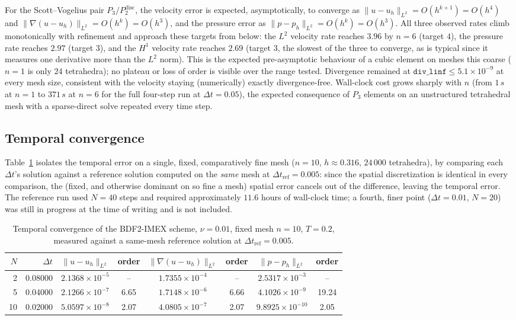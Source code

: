 \documentclass[11pt]{article}
\begin{document}
For the Scott--Vogelius pair $P_3/P_2^{\mathrm{disc}}$, the velocity error is expected,
asymptotically, to converge as $\|u-u_h\|_{L^2}=O(h^{k+1})=O(h^4)$ and
$\|\nabla(u-u_h)\|_{L^2}=O(h^{k})=O(h^3)$, and the pressure error as
$\|p-p_h\|_{L^2}=O(h^{k})=O(h^3)$. All three observed rates climb monotonically with
refinement and approach these targets from below: the $L^2$ velocity rate reaches $3.96$
by $n=6$ (target $4$), the pressure rate reaches $2.97$ (target $3$), and the $H^1$
velocity rate reaches $2.69$ (target $3$, the slowest of the three to converge, as is
typical since it measures one derivative more than the $L^2$ norm). This is the expected
pre-asymptotic behaviour of a cubic element on meshes this coarse ($n=1$ is only $24$
tetrahedra); no plateau or loss of order is visible over the range tested. Divergence
remained at $\mathtt{div\_linf}\le5.1\times10^{-9}$ at every mesh size, consistent with
the velocity staying (numerically) exactly divergence-free. Wall-clock cost grows sharply
with $n$ (from $1\,\si{s}$ at $n=1$ to $371\,\si{s}$ at $n=6$ for the full four-step run at
$\Delta t=0.05$), the expected consequence of $P_3$ elements on an unstructured tetrahedral
mesh with a sparse-direct solve repeated every time step.

\subsection{Temporal convergence}
\label{sec:3d-time}

Table~\ref{tab:3d-time} isolates the temporal error on a single, fixed, comparatively fine
mesh ($n=10$, $h\approx0.316$, $24\,000$ tetrahedra), by comparing each $\Delta t$'s
solution against a reference solution computed on the \emph{same} mesh at
$\Delta t_{\mathrm{ref}}=0.005$: since the spatial discretization is identical in every
comparison, the (fixed, and otherwise dominant on so fine a mesh) spatial error cancels
out of the difference, leaving the temporal error. The reference run used $N=40$ steps and
required approximately $11.6$ hours of wall-clock time; a fourth, finer point
($\Delta t=0.01$, $N=20$) was still in progress at the time of writing and is not included.

\begin{table}[h]\centering
\caption{Temporal convergence of the BDF2-IMEX scheme, $\nu=0.01$, fixed mesh $n=10$,
$T=0.2$, measured against a same-mesh reference solution at
$\Delta t_{\mathrm{ref}}=0.005$.}
\label{tab:3d-time}
\begin{tabular}{rrcccccc}
\toprule
$N$ & $\Delta t$ & $\|u-u_h\|_{L^2}$ & order & $\|\nabla(u-u_h)\|_{L^2}$ & order & $\|p-p_h\|_{L^2}$ & order \\
\midrule
2  & 0.08000 & $2.1368\times10^{-5}$ & --    & $1.7355\times10^{-4}$ & --    & $2.5317\times10^{-3}$ & --    \\
5  & 0.04000 & $2.1266\times10^{-7}$ & 6.65  & $1.7148\times10^{-6}$ & 6.66  & $4.1026\times10^{-9}$ & 19.24 \\
10 & 0.02000 & $5.0597\times10^{-8}$ & 2.07  & $4.0805\times10^{-7}$ & 2.07  & $9.8925\times10^{-10}$& 2.05  \\
\bottomrule
\end{tabular}
\end{table}
\end{document}

